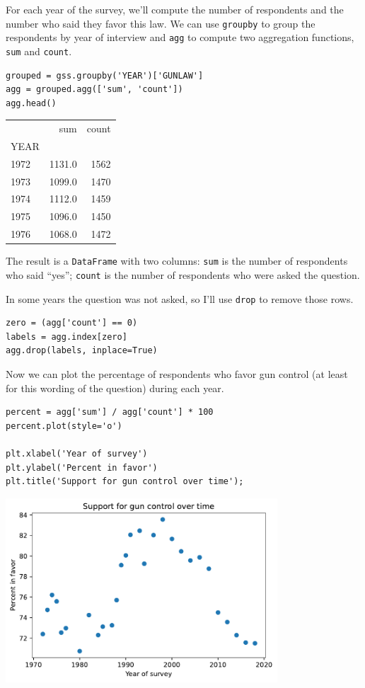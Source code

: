 For each year of the survey, we'll compute the number of respondents and
the number who said they favor this law. We can use
\passthrough{\lstinline!groupby!} to group the respondents by year of
interview and \passthrough{\lstinline!agg!} to compute two aggregation
functions, \passthrough{\lstinline!sum!} and
\passthrough{\lstinline!count!}.

\begin{lstlisting}[]
grouped = gss.groupby('YEAR')['GUNLAW']
agg = grouped.agg(['sum', 'count'])
agg.head()
\end{lstlisting}

\begin{tabular}{lrr}
\midrule
{} &     sum &  count \\
YEAR &         &        \\
\midrule
1972 &  1131.0 &   1562 \\
1973 &  1099.0 &   1470 \\
1974 &  1112.0 &   1459 \\
1975 &  1096.0 &   1450 \\
1976 &  1068.0 &   1472 \\
\midrule
\end{tabular}

The result is a \passthrough{\lstinline!DataFrame!} with two columns:
\passthrough{\lstinline!sum!} is the number of respondents who said
``yes''; \passthrough{\lstinline!count!} is the number of respondents
who were asked the question.

In some years the question was not asked, so I'll use
\passthrough{\lstinline!drop!} to remove those rows.

\begin{lstlisting}[]
zero = (agg['count'] == 0)
labels = agg.index[zero]
agg.drop(labels, inplace=True)
\end{lstlisting}

Now we can plot the percentage of respondents who favor gun control (at
least for this wording of the question) during each year.

\begin{lstlisting}[]
percent = agg['sum'] / agg['count'] * 100
percent.plot(style='o')

plt.xlabel('Year of survey')
plt.ylabel('Percent in favor')
plt.title('Support for gun control over time');
\end{lstlisting}

\begin{center}
\includegraphics[width=4in]{chapters/11_resampling_files/11_resampling_93_0.pdf}
\end{center}

